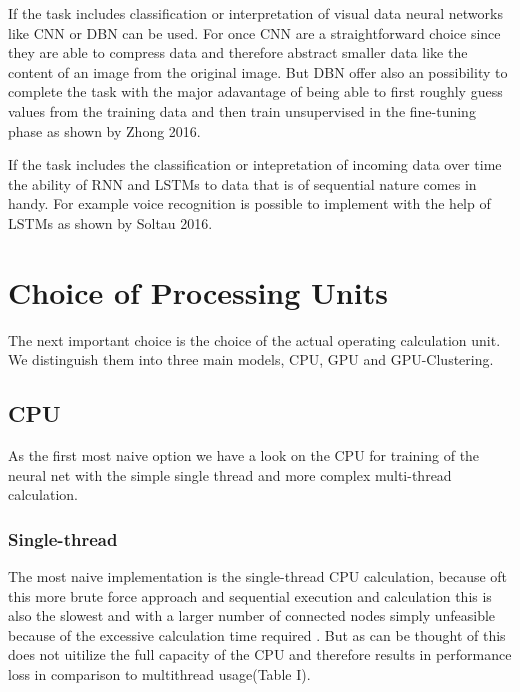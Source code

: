 \documentclass[conference]{IEEEtran}
\begin{document}
If the task includes classification or interpretation of visual data neural networks like CNN or DBN can be used. For once CNN are a straightforward choice since they are able to compress data and therefore abstract smaller data like the content of an image from the original image. But DBN offer also an possibility to complete the task with the major adavantage of being able to first roughly guess values from the training data and then train unsupervised in the fine-tuning phase as shown by Zhong 2016\cite{zhong2016diversified}.

If the task includes the classification or intepretation of incoming data over time the ability of RNN and LSTMs to data that is of sequential nature comes in handy. For example voice recognition is possible to implement with the help of LSTMs as shown by Soltau 2016\cite{soltau2016neural}.






\section{Choice of Processing Units}
The next important choice is the choice of the actual operating calculation unit. We distinguish them into three main models, CPU, GPU and GPU-Clustering.
\subsection{CPU}
As the first most naive option we have a look on the CPU for training of the neural net with the simple single thread and more complex multi-thread calculation.
\subsubsection{Single-thread}
The most naive implementation is the single-thread CPU calculation, because oft this more  brute force approach and sequential execution and calculation this is also the slowest and with a larger number of connected nodes simply unfeasible because of the excessive calculation time required . But as can be thought of this does not uitilize the full capacity of the CPU and therefore results in performance loss in comparison to multithread usage(Table I).
\end{document}
